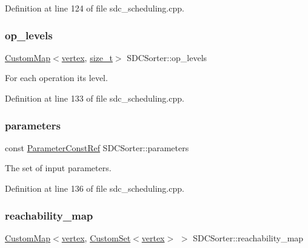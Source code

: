 Definition at line 124 of file sdc\+\_\+scheduling.\+cpp.

\mbox{\label{classSDCSorter_ab3fb25d7605e5f2cfc2f068659241aa6}} 
\subsubsection{\texorpdfstring{op\+\_\+levels}{op\_levels}}
{\footnotesize\ttfamily \hyperlink{custom__map_8hpp_a18ca01763abbe3e5623223bfe5aaac6b}{Custom\+Map}$<$\hyperlink{graph_8hpp_abefdcf0544e601805af44eca032cca14}{vertex}, \hyperlink{tutorial__fpt__2017_2intro_2sixth_2test_8c_a7c94ea6f8948649f8d181ae55911eeaf}{size\+\_\+t}$>$ S\+D\+C\+Sorter\+::op\+\_\+levels\hspace{0.3cm}{\ttfamily [private]}}



For each operation its level. 



Definition at line 133 of file sdc\+\_\+scheduling.\+cpp.

\mbox{\label{classSDCSorter_a988f0e368b0a6a2e4daec2e550977456}} 
\subsubsection{\texorpdfstring{parameters}{parameters}}
{\footnotesize\ttfamily const \hyperlink{Parameter_8hpp_a37841774a6fcb479b597fdf8955eb4ea}{Parameter\+Const\+Ref} S\+D\+C\+Sorter\+::parameters\hspace{0.3cm}{\ttfamily [private]}}



The set of input parameters. 



Definition at line 136 of file sdc\+\_\+scheduling.\+cpp.

\mbox{\label{classSDCSorter_a393d3f55435fe0038f30a17abf13ccfe}} 
\subsubsection{\texorpdfstring{reachability\+\_\+map}{reachability\_map}}
{\footnotesize\ttfamily \hyperlink{custom__map_8hpp_a18ca01763abbe3e5623223bfe5aaac6b}{Custom\+Map}$<$\hyperlink{graph_8hpp_abefdcf0544e601805af44eca032cca14}{vertex}, \hyperlink{custom__set_8hpp_a615bc2f42fc38a4bb1790d12c759e86f}{Custom\+Set}$<$\hyperlink{graph_8hpp_abefdcf0544e601805af44eca032cca14}{vertex}$>$ $>$ S\+D\+C\+Sorter\+::reachability\+\_\+map\hspace{0.3cm}{\ttfamily [private]}}



